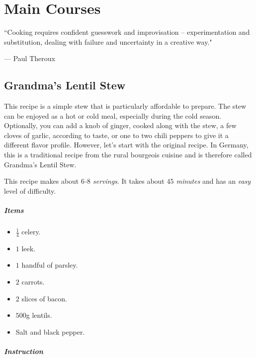 \chapter{Main Courses}
\label{mains}
\epigraph{``Cooking requires confident guesswork and improvisation -- experimentation and substitution, dealing with failure and uncertainty in a creative way."}{--- \textup{Paul Theroux}}

\section{Grandma's Lentil Stew}
\label{grandmaslentilsstew}

This recipe is a simple stew that is particularly affordable to prepare. The stew can be enjoyed as a hot or cold meal, especially during the cold season. Optionally, you can add a knob of ginger, cooked along with the stew, a few cloves of garlic, according to taste, or one to two chili peppers to give it a different flavor profile. However, let's start with the original recipe. In Germany, this is a traditional recipe from the rural bourgeois cuisine and is therefore called Grandma's Lentil Stew.

This recipe makes about \emph{$6$-$8$ servings}. It takes about \emph{$45$ minutes} and has an \emph{easy} level of difficulty. 

\paragraph{Items}
\begin{itemize}[noitemsep]
	\item[\ding{182}] $\frac{1}{4}$ celery.
	\item[\ding{183}] $1$ leek.
	\item[\ding{184}] $1$ handful of parsley.
	\item[\ding{185}] $2$ carrots.
	\item[\ding{186}] $2$ slices of bacon.
	\item[\ding{187}] $500$g lentils.
	\item[\ding{188}] Salt and black pepper.
\end{itemize}

\paragraph{Instruction} 
